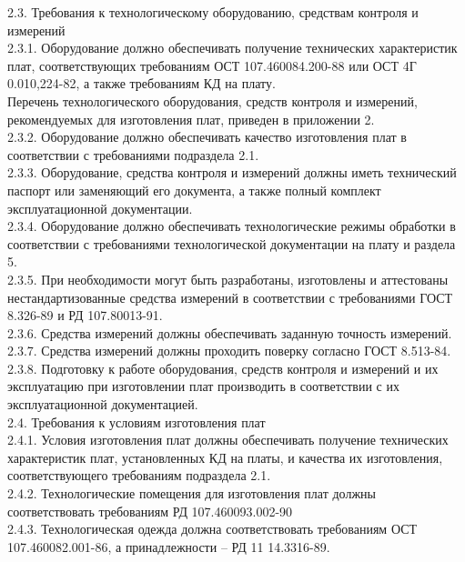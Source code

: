 \documentclass{bmstu}
\begin{document}
	2.3. Требования к технологическому оборудованию, средствам контроля и измерений  \\
	2.3.1. Оборудование должно обеспечивать получение технических характеристик плат, соответствующих требованиям ОСТ 107.460084.200-88 или ОСТ 4Г 0.010,224-82, а также требованиям КД на плату. \\
	Перечень технологического оборудования, средств контроля и измерений, рекомендуемых для изготовления плат, приведен в приложении 2. \\
	2.3.2. Оборудование должно обеспечивать качество изготовления плат в соответствии с требованиями подраздела 2.1. \\
	2.3.3. Оборудование, средства контроля и измерений должны иметь технический паспорт или заменяющий его документа, а также полный комплект эксплуатационной документации. \\
	2.3.4. Оборудование должно обеспечивать технологические режимы обработки в соответствии с требованиями технологической документации на плату и раздела 5. \\
	2.3.5. При необходимости могут быть разработаны, изготовлены и аттестованы нестандартизованные средства  измерений в соответствии с требованиями ГОСТ 8.326-89 и РД 107.80013-91. \\
	2.3.6. Средства  измерений должны обеспечивать    заданную точность  измерений. \\
	2.3.7. Средства  измерений должны проходить поверку согласно ГОСТ 8.513-84. \\
	2.3.8. Подготовку к работе оборудования, средств контроля и измерений и их эксплуатацию при изготовлении плат производить в соответствии с их эксплуатационной документацией. \\
	
	
	2.4. Требования к условиям изготовления плат \\
	2.4.1. Условия изготовления плат должны обеспечивать получение технических характеристик плат, установленных КД на платы, и качества их изготовления, соответствующего требованиям подраздела 2.1. \\
	2.4.2. Технологические помещения для изготовления плат должны соответствовать требованиям  РД 107.460093.002-90 \\
	2.4.3. Технологическая одежда должна соответствовать требованиям  ОСТ  107.460082.001-86,  а  принадлежности – РД 11 14.3316-89. \\
	
\end{document}
